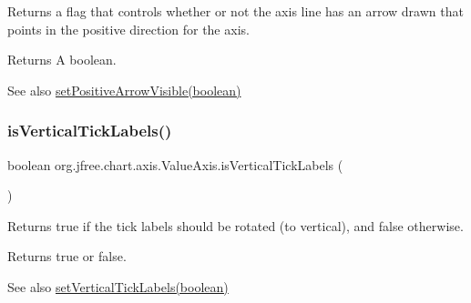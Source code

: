 Returns a flag that controls whether or not the axis line has an arrow drawn that points in the positive direction for the axis.

\begin{DoxyReturn}{Returns}
A boolean.
\end{DoxyReturn}
\begin{DoxySeeAlso}{See also}
\mbox{\hyperlink{classorg_1_1jfree_1_1chart_1_1axis_1_1_value_axis_ace6e9ae3bfb65950ec5ca771f432630f}{set\+Positive\+Arrow\+Visible(boolean)}} 
\end{DoxySeeAlso}
\mbox{\label{classorg_1_1jfree_1_1chart_1_1axis_1_1_value_axis_a56e525f6ffdb6a75d1479f9d701db135}} 
\subsubsection{\texorpdfstring{is\+Vertical\+Tick\+Labels()}{isVerticalTickLabels()}}
{\footnotesize\ttfamily boolean org.\+jfree.\+chart.\+axis.\+Value\+Axis.\+is\+Vertical\+Tick\+Labels (\begin{DoxyParamCaption}{ }\end{DoxyParamCaption})}

Returns {\ttfamily true} if the tick labels should be rotated (to vertical), and {\ttfamily false} otherwise.

\begin{DoxyReturn}{Returns}
{\ttfamily true} or {\ttfamily false}.
\end{DoxyReturn}
\begin{DoxySeeAlso}{See also}
\mbox{\hyperlink{classorg_1_1jfree_1_1chart_1_1axis_1_1_value_axis_a748957d44aba12f460d90707e434f336}{set\+Vertical\+Tick\+Labels(boolean)}} 
\end{DoxySeeAlso}
\mbox{\label{classorg_1_1jfree_1_1chart_1_1axis_1_1_value_axis_ae06f616d1aea4723ac068cba20e9347f}} 
